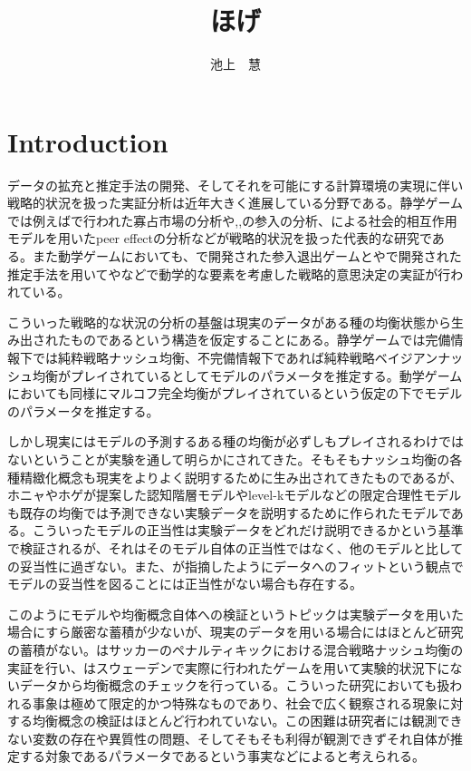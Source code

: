 \documentclass{jsarticle}
\begin{document}
\title{ほげ}
\author{池上　慧}
\maketitle

\section{Introduction}
データの拡充と推定手法の開発、そしてそれを可能にする計算環境の実現に伴い戦略的状況を扱った実証分析は近年大きく進展している分野である。静学ゲームでは例えば\cite{1}で行われた寡占市場の分析や\cite{2},\cite{3},\cite{4}の参入の分析、\cite{5}による社会的相互作用モデルを用いたpeer effectの分析などが戦略的状況を扱った代表的な研究である。また動学ゲームにおいても、\cite{6}で開発された参入退出ゲームと\cite{9}や\cite{10}で開発された推定手法を用いて\cite{7}や\cite{8}などで動学的な要素を考慮した戦略的意思決定の実証が行われている。

こういった戦略的な状況の分析の基盤は現実のデータがある種の均衡状態から生み出されたものであるという構造を仮定することにある。静学ゲームでは完備情報下では純粋戦略ナッシュ均衡、不完備情報下であれば純粋戦略ベイジアンナッシュ均衡がプレイされているとしてモデルのパラメータを推定する。動学ゲームにおいても同様にマルコフ完全均衡がプレイされているという仮定の下でモデルのパラメータを推定する。

しかし現実にはモデルの予測するある種の均衡が必ずしもプレイされるわけではないということが実験を通して明らかにされてきた。そもそもナッシュ均衡の各種精緻化概念も現実をよりよく説明するために生み出されてきたものであるが、ホニャやホゲが提案した認知階層モデルやlevel-kモデルなどの限定合理性モデルも既存の均衡では予測できない実験データを説明するために作られたモデルである。こういったモデルの正当性は実験データをどれだけ説明できるかという基準で検証されるが、それはそのモデル自体の正当性ではなく、他のモデルと比しての妥当性に過ぎない。また、\cite{12}が指摘したようにデータへのフィットという観点でモデルの妥当性を図ることには正当性がない場合も存在する。

このようにモデルや均衡概念自体への検証というトピックは実験データを用いた場合にすら厳密な蓄積が少ないが、現実のデータを用いる場合にはほとんど研究の蓄積がない。\cite{13}はサッカーのペナルティキックにおける混合戦略ナッシュ均衡の実証を行い、\cite{11}はスウェーデンで実際に行われたゲームを用いて実験的状況下にないデータから均衡概念のチェックを行っている。こういった研究においても扱われる事象は極めて限定的かつ特殊なものであり、社会で広く観察される現象に対する均衡概念の検証はほとんど行われていない。この困難は研究者には観測できない変数の存在や異質性の問題、そしてそもそも利得が観測できずそれ自体が推定する対象であるパラメータであるという事実などによると考えられる。
\end{document}
